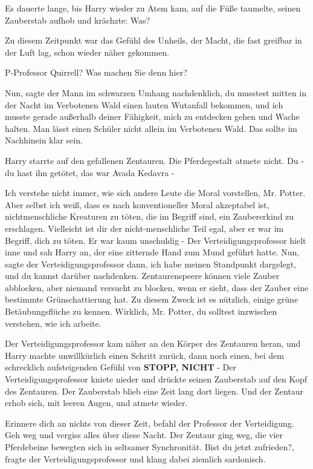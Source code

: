 Es dauerte lange, bis Harry wieder zu Atem kam, auf die Füße taumelte, seinen
Zauberstab aufhob und krächzte: \glqq{}Was?\grqq{}

Zu diesem Zeitpunkt war das Gefühl des Unheils, der Macht, die fast greifbar in
der Luft lag, schon wieder näher gekommen.

\glqq{}P-Professor Quirrell? Was machen Sie denn hier?\grqq{}

\glqq{}Nun\grqq{}, sagte der Mann im schwarzen Umhang nachdenklich, \glqq{}du
musstest mitten in der Nacht im Verbotenen Wald einen lauten Wutanfall bekommen,
und ich musste gerade außerhalb deiner Fähigkeit, mich zu entdecken gehen und
Wache halten. Man lässt einen Schüler nicht allein im Verbotenen Wald. Das
sollte im Nachhinein klar sein.\grqq{}

Harry starrte auf den gefallenen Zentauren. Die Pferdegestalt atmete nicht.
\glqq{}Du - du hast ihn getötet, das war Avada Kedavra -\grqq{}

\glqq{}Ich verstehe nicht immer, wie sich andere Leute die Moral vorstellen, Mr.
Potter. Aber selbst ich weiß, dass es nach konventioneller Moral akzeptabel ist,
nichtmenschliche Kreaturen zu töten, die im Begriff sind, ein Zaubererkind zu
erschlagen. Vielleicht ist dir der nicht-menschliche Teil egal, aber er war im
Begriff, dich zu töten. Er war kaum unschuldig -\grqq{} Der Verteidigungsprofessor
hielt inne und sah Harry an, der eine zitternde Hand zum Mund geführt hatte.
\glqq{}Nun\grqq{}, sagte der Verteidigungsprofessor dann, \glqq{}ich habe meinen
Standpunkt dargelegt, und du kannst darüber nachdenken. Zentaurenspeere können
viele Zauber abblocken, aber niemand versucht zu blocken, wenn er sieht, dass
der Zauber eine bestimmte Grünschattierung hat. Zu diesem Zweck ist es nützlich,
einige grüne Betäubungsflüche zu kennen. Wirklich, Mr. Potter, du solltest
inzwischen verstehen, wie ich arbeite.\grqq{}

Der Verteidigungsprofessor kam näher an den Körper des Zentauren heran, und
Harry machte unwillkürlich einen Schritt zurück, dann noch einen, bei dem
schrecklich aufsteigenden Gefühl von \textbf{STOPP, NICHT} - Der
Verteidigungsprofessor kniete nieder und drückte seinen Zauberstab auf den Kopf
des Zentauren. Der Zauberstab blieb eine Zeit lang dort liegen. Und der Zentaur
erhob sich, mit leeren Augen, und atmete wieder.

\glqq{}Erinnere dich an nichts von dieser Zeit\grqq{}, befahl der Professor der
Verteidigung. \glqq{}Geh weg und vergiss alles über diese Nacht.\grqq{} Der
Zentaur ging weg, die vier Pferdebeine bewegten sich in seltsamer Synchronität.
\glqq{}Bist du jetzt zufrieden?\grqq{}, fragte der Verteidigungsprofessor und
klang dabei ziemlich sardonisch.

